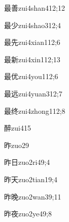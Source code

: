 \begin{verbete}{最善}{zui4shan4}{12;12}
\end{verbete}

\begin{verbete}{最少}{zui4shao3}{12;4}
\end{verbete}

\begin{verbete}{最先}{zui4xian1}{12;6}
\end{verbete}

\begin{verbete}{最新}{zui4xin1}{12;13}
\end{verbete}

\begin{verbete}{最优}{zui4you1}{12;6}
\end{verbete}

\begin{verbete}{最远}{zui4yuan3}{12;7}
\end{verbete}

\begin{verbete}{最终}{zui4zhong1}{12;8}
\end{verbete}

\begin{verbete}{醉}{zui4}{15}
\end{verbete}

\begin{verbete}{昨}{zuo2}{9}
\end{verbete}

\begin{verbete}{昨日}{zuo2ri4}{9;4}
\end{verbete}

\begin{verbete}{昨天}{zuo2tian1}{9;4}
\end{verbete}

\begin{verbete}{昨晚}{zuo2wan3}{9;11}
\end{verbete}

\begin{verbete}{昨夜}{zuo2ye4}{9;8}
\end{verbete}

